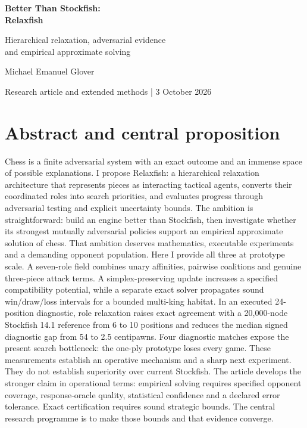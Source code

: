 \documentclass[10pt]{article}
\begin{document}
\begin{center}
{\fontsize{29}{33}\selectfont\bfseries\color{ink} Better Than Stockfish:\\Relaxfish}\par\vspace{9pt}
{\large\color{blue}Hierarchical relaxation, adversarial evidence\\and empirical approximate solving}\par\vspace{9pt}
Michael Emanuel Glover\par
{\small Research article and extended methods | 3 October 2026}
\end{center}

\section*{Abstract and central proposition}
Chess is a finite adversarial system with an exact outcome and an immense space of possible explanations. I propose Relaxfish: a hierarchical relaxation architecture that represents pieces as interacting tactical agents, converts their coordinated roles into search priorities, and evaluates progress through adversarial testing and explicit uncertainty bounds. The ambition is straightforward: build an engine better than Stockfish, then investigate whether its strongest mutually adversarial policies support an empirical approximate solution of chess. That ambition deserves mathematics, executable experiments and a demanding opponent population. Here I provide all three at prototype scale. A seven-role field combines unary affinities, pairwise coalitions and genuine three-piece attack terms. A simplex-preserving update increases a specified compatibility potential, while a separate exact solver propagates sound win/draw/loss intervals for a bounded multi-king habitat. In an executed 24-position diagnostic, role relaxation raises exact agreement with a 20,000-node Stockfish 14.1 reference from 6 to 10 positions and reduces the median signed diagnostic gap from 54 to 2.5 centipawns. Four diagnostic matches expose the present search bottleneck: the one-ply prototype loses every game. These measurements establish an operative mechanism and a sharp next experiment. They do not establish superiority over current Stockfish. The article develops the stronger claim in operational terms: empirical solving requires specified opponent coverage, response-oracle quality, statistical confidence and a declared error tolerance. Exact certification requires sound strategic bounds. The central research programme is to make those bounds and that evidence converge.
\end{document}
